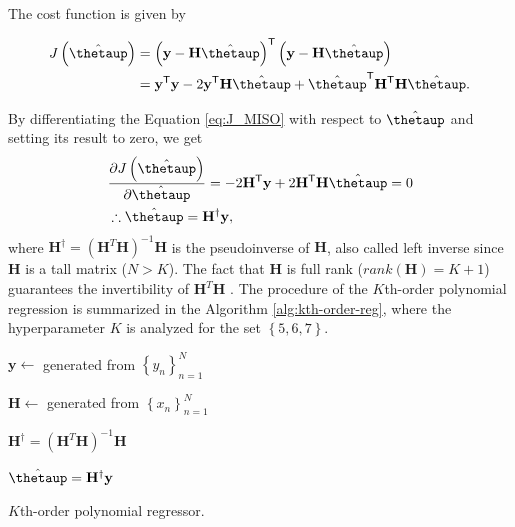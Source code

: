 \documentclass[english]{sobraep}
\newcommand{\trans}{\mathsf{T}}
\begin{document}
The cost function is given by

\begin{align}
    J\left( \hat{\boldsymbol{\thetaup}} \right) & = \left( \mathbf{y} - \mathbf{H} \hat{\boldsymbol{\thetaup}} \right)^{\trans} \left( \mathbf{y} - \mathbf{H} \hat{\boldsymbol{\thetaup}} \right) \nonumber \\
    & = \mathbf{y}^\trans\mathbf{y} - 2\mathbf{y}^\trans \mathbf{H}\hat{\boldsymbol{\thetaup}} + \hat{\boldsymbol{\thetaup}}^\trans \mathbf{H}^\trans \mathbf{H} \hat{\boldsymbol{\thetaup}}.
    \label{eq:J_MISO}
\end{align}

By differentiating the Equation \eqref{eq:J_MISO} with respect to \(\hat{\boldsymbol{\thetaup}}\) and setting its result to zero, we get
\begin{align}
    &\frac{\partial J\left( \hat{\boldsymbol{\thetaup}} \right)}{\partial \hat{\boldsymbol{\thetaup}}} = - 2\mathbf{H}^\trans \mathbf{y} + 2 \mathbf{H}^\trans \mathbf{H} \hat{\boldsymbol{\thetaup}} = 0 \nonumber \\
    &\therefore \hat{\boldsymbol{\thetaup}} = \mathbf{H}^\dagger \mathbf{y},
\end{align}
where \(\mathbf{H}^\dagger = \left( \mathbf{H}^T\mathbf{H} \right)^{-1}\mathbf{H}\) is the pseudoinverse of \(\mathbf{H}\), also called left inverse since \(\mathbf{H}\) is a tall matrix (\(N>K\)). The fact that \(\mathbf{H}\) is full rank (\(rank(\mathbf{H})=K+1\)) guarantees the invertibility of \(\mathbf{H}^T\mathbf{H}\) \cite{strang1993introduction}. The procedure of the \(K\)th-order polynomial regression is summarized in the Algorithm \ref{alg:kth-order-reg}, where the hyperparameter \(K\) is analyzed for the set \(\left\{ 5,6,7 \right\}\).

\begin{algorithm}[!ht]
    \DontPrintSemicolon
      
        {
            \(\mathbf{y} \leftarrow\) generated from \(\left\{ y_n \right\}_{n=1}^N\)

            \(\mathbf{H} \leftarrow\) generated from \(\left\{ x_n \right\}_{n=1}^N\)

            \(\mathbf{H}^\dagger = \left( \mathbf{H}^T\mathbf{H} \right)^{-1}\mathbf{H}\) 

            \(\hat{\boldsymbol{\thetaup}} = \mathbf{H}^\dagger \mathbf{y}\)
        }
    
    \caption{\(K\)th-order polynomial regressor.}
    \label{alg:kth-order-reg}
\end{algorithm}
\end{document}
